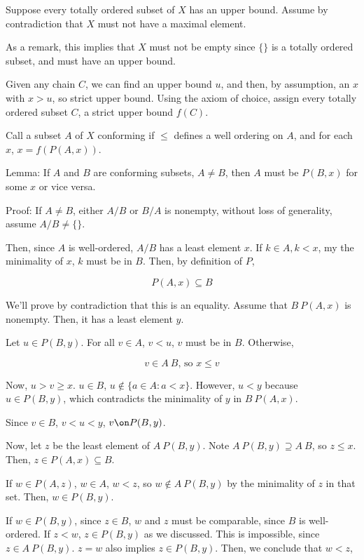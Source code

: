 \documentclass{article}
\begin{document}
        Suppose every totally ordered subset of $X$ has an upper bound. Assume
        by contradiction that $X$ must not have a maximal element.

        As a remark, this implies that $X$ must not be empty since $\{\}$ is a
        totally ordered subset, and must have an upper bound.

        Given any chain $C$, we can find an upper bound $u$, and then, by
        assumption, an $x$ with $x>u$, so strict upper bound. Using the axiom of
        choice, assign every totally ordered subset $C$, a strict upper bound
        $f(C)$.

        Call a subset $A$ of $X$ conforming if $\leq$ defines a well ordering on
        $A$, and for each $x$, $x = f(P(A,x))$.

        Lemma: If $A$ and $B$ are conforming subsets, $A \neq B$, then $A$ must
        be $P(B,x)$ for some $x$ or vice versa.

        Proof: If $A \neq B$, either $A/B$ or $B/A$ is nonempty, without loss of
        generality, assume $A/B \neq \{\}$.

        Then, since $A$ is well-ordered, $A/B$ has a least element $x$. If $k
        \in A, k < x$, my the minimality of $x$, $k$ must be in $B$. Then, by
        definition of $P$,

        \[P(A,x) \subseteq B\]

        We'll prove by contradiction that this is an equality. Assume that $B \
        P(A,x)$ is nonempty. Then, it has a least element $y$.

        Let $u \in P(B,y)$. For all $v \in A$, $v<u$, $v$ must be in $B$.
        Otherwise,

        \[v \in A \ B \text{, so } x \leq v\]

        Now, $u > v \geq x$. $u \in B$, $u \notin \{a \in A: a < x\}$. However,
        $u < y$ because $u \in P(B,y)$, which contradicts the minimality of $y$
        in $B \ P(A,x)$.

        Since $v \in B$, $v < u < y$, $v \on P(B,y)$.

        Now, let $z$ be the least element of $A \ P(B,y)$. Note $A \ P(B,y)
        \supseteq A \ B$, so $z \leq x$. Then, $z \in P(A,x) \subseteq B$.

        If $w \in P(A,z)$, $w \in A$, $w < z$, so $w \notin A \ P(B,y)$ by the
        minimality of $z$ in that set. Then, $w \in P(B,y)$.

        If $w \in P(B,y)$, since $z \in B$, $w$ and $z$ must be comparable,
        since $B$ is well-ordered. If $z < w$, $z \in P(B,y)$ as we
        discussed. This is impossible, since $z \in A \ P(B,y)$. $z = w$ also
        implies $z \in P(B,y)$. Then, we conclude that $w < z$,
\end{document}
